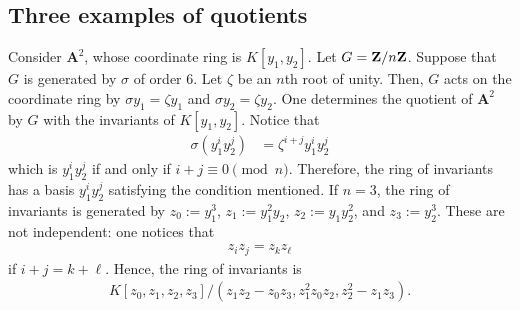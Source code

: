 \documentclass [11 pt, oneside] {article}
\begin{document}
\subsection{Three examples of quotients}
\begin{example}\label{}
Consider $\mathbf{A}^2$, whose coordinate ring is $K[y_1,y_2]$. Let $G=\mathbf Z / n\mathbf Z$. Suppose that $G$ is generated by $\sigma$ of order $6$. Let $\zeta$ be an $n$th root of unity. Then, $G$ acts on the coordinate ring by $\sigma y_1 = \zeta y_1$ and $\sigma y_2= \zeta y_2$. One determines the quotient of $\mathbf{A}^2$ by $G$ with the invariants of $K[y_1,y_2]$. Notice that 
\begin{align*}
	\sigma(y_1^iy_2^j) &= \zeta^{i+j} y_1^iy_2^j
\end{align*}
which is $y_1^iy_2^j$ if and only if $i+j\equiv 0\pmod n$. Therefore, the ring of invariants has a basis $y_1^iy_2^j$ satisfying the condition mentioned. If $n=3$, the ring of invariants is generated by $z_0:=y_1^3$, $z_1:=y_1^2y_2$, $z_2:=y_1y_2^2$, and $z_3:=y_2^3$. These are not independent: one notices that
\begin{align*}
	z_iz_j = z_kz_\ell
\end{align*}
if $i+j=k+\ell$. Hence, the ring of invariants is
\begin{align*}
	K[z_0,z_1,z_2,z_3] / (z_1z_2-z_0z_3, z_1^2 z_0z_2, z_2^2-z_1z_3). 
\end{align*}
\end{example}
\end{document}
